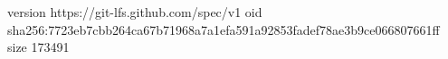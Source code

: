 version https://git-lfs.github.com/spec/v1
oid sha256:7723eb7cbb264ca67b71968a7a1efa591a92853fadef78ae3b9ce066807661ff
size 173491
